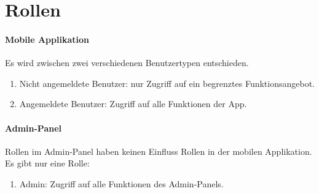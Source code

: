 \section{Rollen}

\paragraph{Mobile Applikation}
Es wird zwischen zwei verschiedenen Benutzertypen entschieden.
\begin{enumerate}
    \item Nicht angemeldete Benutzer: nur Zugriff auf ein begrenztes Funktionsangebot.
    \item Angemeldete Benutzer: Zugriff auf alle Funktionen der App.
\end{enumerate}

\paragraph{Admin-Panel}
Rollen im Admin-Panel haben keinen Einfluss Rollen in der mobilen Applikation.
Es gibt nur eine Rolle:
\begin{enumerate}
    \item Admin: Zugriff auf alle Funktionen des Admin-Panels.
\end{enumerate}
